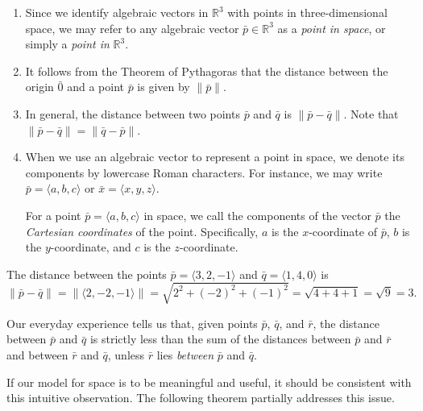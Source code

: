 \begin{notebox}
\begin{enumerate}
    \item Since we identify algebraic vectors in $\mathbb{R}^3$ with points in three-dimensional space, we may refer to any algebraic vector $\bar{p} \in \mathbb{R}^3$ as a \textit{point in space}, or simply a \textit{point in} $\mathbb{R}^3$.

    \item It follows from the Theorem of Pythagoras that the distance between the origin $\bar{0}$ and a point $\bar{p}$ is given by $\|\bar{p}\|$.

    \item In general, the distance between two points $\bar{p}$ and $\bar{q}$ is $\|\bar{p} - \bar{q}\|$. Note that $\|\bar{p} - \bar{q}\| = \|\bar{q} - \bar{p}\|$.

    \item When we use an algebraic vector to represent a point in space, we denote its components by lowercase Roman characters. For instance, we may write $\bar{p} = \langle a, b, c \rangle$ or $\bar{x} = \langle x, y, z \rangle$.

    \vspace{0.5em}
    For a point $\bar{p} = \langle a, b, c \rangle$ in space, we call the components of the vector $\bar{p}$ the \textit{Cartesian coordinates} of the point. Specifically, $a$ is the $x$-coordinate of $\bar{p}$, $b$ is the $y$-coordinate, and $c$ is the $z$-coordinate.
\end{enumerate}
\end{notebox}

\begin{examplebox}
  The distance between the points $\bar{p} = \langle 3, 2, -1 \rangle$ and $\bar{q} = \langle 1, 4, 0 \rangle$ is
\[
\|\bar{p} - \bar{q}\| = \|\langle 2, -2, -1 \rangle\| = \sqrt{2^2 + (-2)^2 + (-1)^2} = \sqrt{4 + 4 + 1} = \sqrt{9} = 3.
\]
\end{examplebox}

Our everyday experience tells us that, given points $\bar{p}$, $\bar{q}$, and $\bar{r}$, the distance between $\bar{p}$ and $\bar{q}$ is strictly less than the sum of the distances between $\bar{p}$ and $\bar{r}$ and between $\bar{r}$ and $\bar{q}$, unless $\bar{r}$ lies \textit{between} $\bar{p}$ and $\bar{q}$. 

If our model for space is to be meaningful and useful, it should be consistent with this intuitive observation. The following theorem partially addresses this issue.

